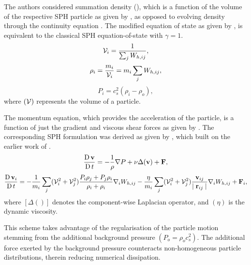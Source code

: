 The authors considered summation density (), which is a function of the volume of the respective SPH particle as given by , as opposed to evolving density through the continuity equation \parencite{hu2006multi}. The modified equation of state as given by , is equivalent to the classical SPH equation-of-state with $\gamma=1$.
\begin{equation}
    \Vol_i = \frac{1}{\sum_j \WIJ},
    \label{eq:Adami2012-vol}
\end{equation}
\begin{equation}
    \rho_i = \frac{m_i}{\Vol_i} = m_i\sum_j \WIJ,
    \label{eq:Adami2012-summation-density}
\end{equation}
\begin{equation}
    P_i = c_s^2 (\rho_i - \rho_o),
    \label{eq:Adami2012-eos}
\end{equation}
where $(\mathcal{V})$ represents the volume of a particle.

The momentum equation, which provides the acceleration of the particle, is a function of just the gradient and viscous shear forces as given by . The corresponding SPH formulation was derived as given by , which built on the earlier work of \cite{hu2007incompressible}.
\begin{equation}
    \LagDerivative{\vect{v}} = -\frac{1}{\rho}\nabla P + \nu \Delta( \vect{v} ) + \vect{F},
    \label{eq:Adami2012-mom-governing}
\end{equation}
\begin{equation}
    \LagDerivative{\vect{v}_i} = -\frac{1}{m_i} \sum_j (\Vol^2_i + \Vol^2_j) \frac{P_i \rho_j + P_j \rho_i}{\rho_i + \rho_i} \DWIJ - \frac{\eta}{m_i} \sum_j (\Vol^2_i + \Vol^2_j) \frac{\VIJ}{\RtwoIJ[]}\DWIJ + \vect{F}_i,
    \label{eq:Adami2012-mom-sph}
\end{equation}
where $[\Delta ()]$ denotes the component-wise Laplacian operator, and $(\eta)$ is the dynamic viscosity.

This scheme takes advantage of the regularisation of the
particle motion stemming from the additional background pressure $(P_o = \rho_o c_s^2)$. The additional force exerted by the background pressure counteracts non-homogeneous particle distributions, therein reducing numerical dissipation.


